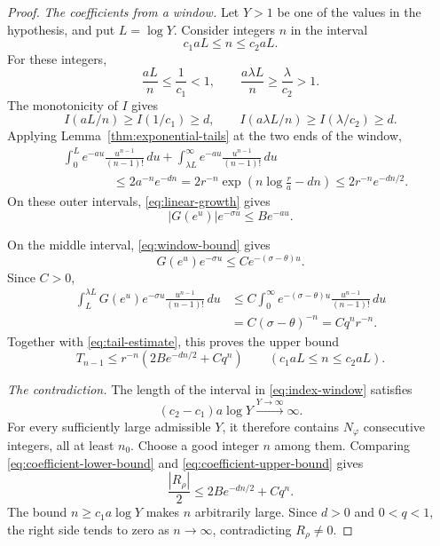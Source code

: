 \begin{proof}
\emph{The coefficients from a window.} Let $Y>1$ be one of the values in the hypothesis, and put $L=\log Y$. Consider integers $n$ in the interval
\begin{equation}\label{eq:index-window}
c_1aL\leq n\leq c_2aL.
\end{equation}
For these integers,
\[
\frac{aL}{n}\leq\frac1{c_1}<1,
\qquad
\frac{a\lambda L}{n}\geq\frac{\lambda}{c_2}>1.
\]
The monotonicity of $I$ gives
\[
I(aL/n)\geq I(1/c_1)\geq d,
\qquad
I(a\lambda L/n)\geq I(\lambda/c_2)\geq d.
\]
Applying Lemma~\ref{thm:exponential-tails} at the two ends of the window,
\begin{equation}\label{eq:tail-estimate}
\begin{aligned}
&\int_0^L e^{-au}\frac{u^{n-1}}{(n-1)!}\,du
+
\int_{\lambda L}^\infty
e^{-au}\frac{u^{n-1}}{(n-1)!}\,du\\
&\hspace{4em}\leq
2a^{-n}e^{-dn}
=
2r^{-n}\exp\!\left(n\log\frac ra-dn\right)
\leq
2r^{-n}e^{-dn/2}.
\end{aligned}
\end{equation}
On these outer intervals, \eqref{eq:linear-growth} gives
\[
|G(e^u)|e^{-\sigma u}\leq Be^{-au}.
\]

On the middle interval, \eqref{eq:window-bound} gives
\[
G(e^u)e^{-\sigma u}
\leq
Ce^{-(\sigma-\theta)u}.
\]
Since $C>0$,
\[
\begin{aligned}
\int_L^{\lambda L}
G(e^u)e^{-\sigma u}
\frac{u^{n-1}}{(n-1)!}\,du
&\leq
C\int_0^\infty
e^{-(\sigma-\theta)u}
\frac{u^{n-1}}{(n-1)!}\,du\\
&=
C(\sigma-\theta)^{-n}
=
Cq^n r^{-n}.
\end{aligned}
\]
Together with \eqref{eq:tail-estimate}, this proves the upper bound
\begin{equation}\label{eq:coefficient-upper-bound}
T_{n-1}
\leq
r^{-n}\left(2Be^{-dn/2}+Cq^n\right)
\qquad(c_1aL\leq n\leq c_2aL).
\end{equation}

\emph{The contradiction.} The length of the interval in \eqref{eq:index-window} satisfies
\[
(c_2-c_1)a\log Y \xrightarrow{Y\to\infty} \infty.
\]
For every sufficiently large admissible $Y$, it therefore contains $N_\varphi$ consecutive integers, all at least $n_0$. Choose a good integer $n$ among them. Comparing \eqref{eq:coefficient-lower-bound} and \eqref{eq:coefficient-upper-bound} gives
\[
\frac{|R_\rho|}{2}
\leq
2Be^{-dn/2}+Cq^n.
\]
The bound $n\geq c_1a\log Y$ makes $n$ arbitrarily large. Since $d>0$ and $0<q<1$, the right side tends to zero as $n\to\infty$, contradicting $R_\rho\ne 0$.
\end{proof}

